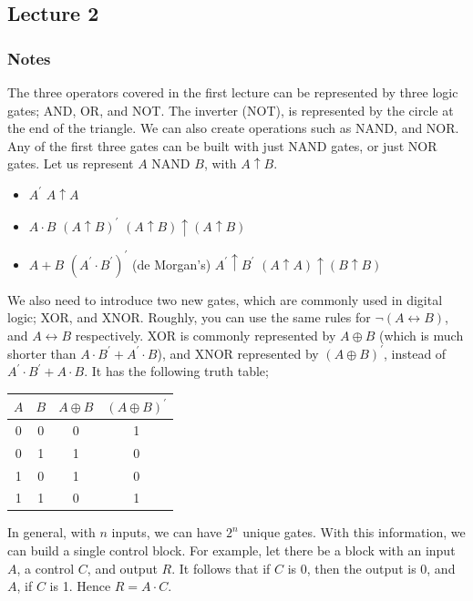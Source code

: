 \documentclass[a4paper, 12pt]{article}
\begin{document}
        \subsection*{Lecture 2}
            \subsubsection*{Notes}
                The three operators covered in the first lecture can be represented by three logic gates; AND, OR, and NOT. The inverter (NOT), is represented by the circle at the end of the triangle. We can also create operations such as NAND, and NOR. Any of the first three gates can be built with just NAND gates, or just NOR gates. Let us represent $A$ NAND $B$, with $A \uparrow B$.
                \begin{itemize}
                    \itemsep0em
                    \item $A^\prime$ \hfill $A \uparrow A$
                    \item $A \cdot B$ \hfill $(A \uparrow B)^\prime$
                        \subitem \hfill $(A \uparrow B) \uparrow (A \uparrow B)$
                    \item $A + B$ \hfill $(A ^\prime \cdot B^\prime)^\prime$ (de Morgan's)
                        \subitem \hfill $A^\prime \uparrow B^\prime$
                        \subitem \hfill $(A \uparrow A) \uparrow (B \uparrow B)$
                \end{itemize}
                We also need to introduce two new gates, which are commonly used in digital logic; XOR, and XNOR. Roughly, you can use the same rules for $\neg (A \leftrightarrow B)$, and $A \leftrightarrow B$ respectively. XOR is commonly represented by $A \oplus B$ (which is much shorter than $A \cdot B^\prime + A^\prime \cdot B$), and XNOR represented by $(A \oplus B)^\prime$, instead of $A^\prime \cdot B^\prime + A \cdot B$. It has the following truth table;
                \begin{center}
                    \begin{tabular}{cc|c|c}
                        $A$ & $B$ & $A \oplus B$ & $(A \oplus B)^\prime$ \\
                        \hline
                        0 & 0 & 0 & 1 \\
                        0 & 1 & 1 & 0 \\
                        1 & 0 & 1 & 0 \\
                        1 & 1 & 0 & 1
                    \end{tabular}
                \end{center}
                In general, with $n$ inputs, we can have $2^n$ unique gates.
                With this information, we can build a single control block. For example, let there be a block with an input $A$, a control $C$, and output $R$. It follows that if $C$ is 0, then the output is 0, and $A$, if $C$ is 1. Hence $R = A \cdot C$.
                \medskip
\end{document}
